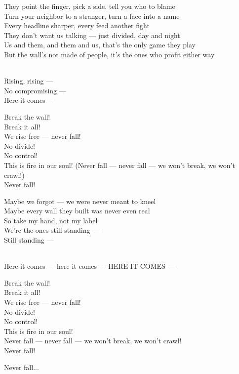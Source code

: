 \begin{lyrics}
They point the finger, pick a side, tell you who to blame\\
Turn your neighbor to a stranger, turn a face into a name\\
Every headline sharper, every feed another fight\\
They don't want us talking — just divided, day and night\\
Us and them, and them and us, that's the only game they play\\
But the wall's not made of people, it's the ones who profit either way

\\
Rising, rising —\\
No compromising —\\
Here it comes —


Break the wall!\\
Break it all!\\
We rise free — never fall!\\
No divide!\\
No control!\\
This is fire in our soul!
(Never fall — never fall — we won't break, we won't crawl!)\\
Never fall!

Maybe we forgot — we were never meant to kneel\\
Maybe every wall they built was never even real\\
So take my hand, not my label\\
We're the ones still standing —\\
Still standing —

\\
Here it comes — here it comes — HERE IT COMES —

Break the wall!\\
Break it all!\\
We rise free — never fall!\\
No divide!\\
No control!\\
This is fire in our soul!\\
Never fall — never fall — we won't break, we won't crawl!\\
Never fall!

Never fall...
\end{lyrics}

